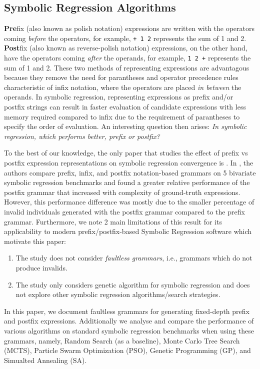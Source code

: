 \documentclass[12pt]{iopart}
\begin{document}
\subsection{Symbolic Regression Algorithms}
\textbf{Pre}fix (also known as polish notation) expressions are written with the operators coming \emph{before} the operators, for example, \texttt{+ 1 2} represents the sum of 1 and 2. \textbf{Post}fix (also known as reverse-polish notation) expressions, on the other hand, have the operators coming \emph{after} the operands, for example, \texttt{1 2 +} represents the sum of 1 and 2. These two methods of representing expressions are advantagous because they remove the need for parantheses and operator precedence rules characteristic of infix notation, where the operators are placed \emph{in between} the operands. In symbolic regression, representing expressions as prefix and/or postfix strings can result in faster evaluation of candidate expressions with less memory required compared to infix due to the requirement of parantheses to specify the order of evaluation. An interesting question then arises: \emph{In symbolic regression, which performs better, prefix or postfix?}
\par To the best of our knowledge, the only paper that studies the effect of prefix vs postfix expression representations on symbolic regression convergence is \cite{hemberg2008pre}.  In \cite{hemberg2008pre}, the authors compare prefix, infix, and postfix notation-based grammars on 5 bivariate symbolic regression benchmarks and found a greater relative performance of the postfix grammar that increased with complexity of ground-truth expressions. 
However, this performance difference was mostly due to the smaller percentage of invalid individuals generated with the postfix grammar compared to the prefix grammar.  
Furthermore, we note 2 main limitations of this result for its applicability to modern prefix/postfix-based Symbolic Regression software which motivate this paper:
\begin{enumerate}
\item The study does not consider \emph{faultless grammars}, i.e., grammars which do not produce invalids.
\item The study only considers genetic algorithm for symbolic regression and does not explore other symbolic regression algorithms/search strategies. 
\end{enumerate}
In this paper, we document faultless grammars for generating fixed-depth prefix and postfix expressions. Additionally we analyse and compare the performance of various algorithms on standard symbolic regression benchmarks when using these grammars, namely, Random Search (as a baseline), Monte Carlo Tree Search (MCTS), Particle Swarm Optimization (PSO), Genetic Programming (GP), and Simualted Annealing (SA). 
\end{document}
